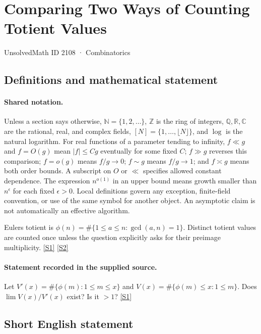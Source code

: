 \documentclass[11pt,a4paper]{article}
\newcommand{\N}{\mathbb{N}}
\newcommand{\Z}{\mathbb{Z}}
\newcommand{\Q}{\mathbb{Q}}
\newcommand{\R}{\mathbb{R}}
\newcommand{\C}{\mathbb{C}}
\newcommand{\sref}[2]{\hyperlink{source:#1:#2}{[S#2]}}
\begin{document}

\setcounter{section}{2107}

\section{Comparing Two Ways of Counting Totient Values}\label{2108}

{\small\sffamily UnsolvedMath ID 2108 · Combinatorics}

\subsection{Definitions and mathematical statement}

\paragraph{Shared notation.}Unless a section says otherwise, $\N=\{1,2,\ldots\}$,
$\Z$ is the ring of integers, $\Q,\R,\C$ are the rational, real, and complex
fields, $[N]=\{1,\ldots,\lfloor N\rfloor\}$, and $\log$ is the natural
logarithm. For real functions of a parameter tending to infinity,
$f\ll g$ and $f=O(g)$ mean $|f|\leq Cg$ eventually for some fixed $C$;
$f\gg g$ reverses this comparison; $f=o(g)$ means $f/g\to0$;
$f\sim g$ means $f/g\to1$; and $f\asymp g$ means both order bounds.
A subscript on $O$ or $\ll$ specifies allowed constant dependence.
The expression $n^{o(1)}$ in an upper bound means growth smaller than
$n^\epsilon$ for each fixed $\epsilon>0$. Local definitions govern any
exception, finite-field convention, or use of the same symbol for another
object. An asymptotic claim is not automatically an effective algorithm.



Euler\textquotesingle s totient is $\phi(n)=\#\{1\leq a\leq n:\gcd(a,n)=1\}$. Distinct totient values are counted once unless the question explicitly asks for their preimage multiplicity. \sref{2108}{1} \sref{2108}{2}

\paragraph{Statement recorded in the supplied source.}
Let $ V'(x)=\#\{\phi(m) : 1\leq m\leq x\} $ and $ V(x)=\#\{\phi(m) \leq x : 1\leq m\}. $ Does $\lim V(x)/V'(x)$ exist? Is it $>1$? \sref{2108}{1}

\subsection{Short English statement}
\end{document}
